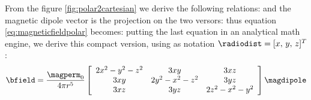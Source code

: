 From the figure \ref{fig:polar2cartesian} we derive the following relations:
and the magnetic dipole vector is the projection on the two versors:
thus equation \ref{eq:magneticfieldpolar} becomes:
putting the last equation in an analytical math engine, we derive this compact version, using as notation $\radiodist = [x,\,y,\,z]^T$:
\begin{equation}
\bfield = \dfrac{\magperm_0}{4 \pi r^5} \magfieldmatrix \magdipole
\end{equation}